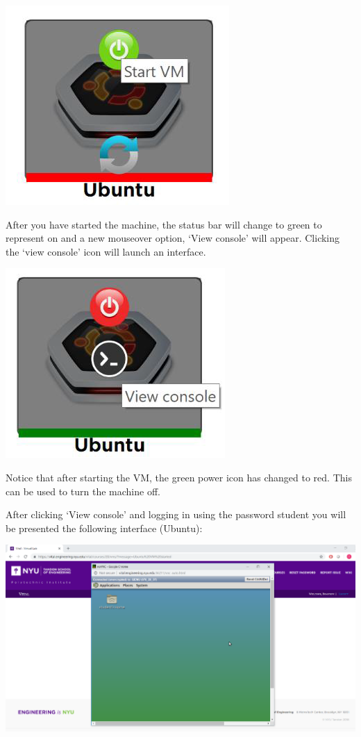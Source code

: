 \documentclass[12pt]{article}
\begin{document}
{%
\centering
\includegraphics[scale=0.50]{start_vm.png}

}
After you have started the machine, the status bar will change to green to represent on and a new mouseover option, ‘View console’ will appear. Clicking the `view console’ icon will launch an interface.

{%
\centering
\includegraphics[scale=0.50]{view_console.png}

}
Notice that after starting the VM, the green power icon has changed to red. This can be used to turn the machine off.

After clicking `View console’ and logging in using the password student you will be presented the following interface (Ubuntu):

{%
\centering
\includegraphics[scale=0.30]{vm_interface.png}

}
\end{document}
